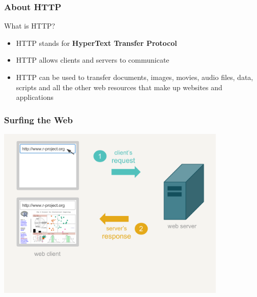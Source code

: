 \documentclass{beamer}\usepackage[]{graphicx}\usepackage[]{color}
\begin{document}

\begin{frame}
\frametitle{About HTTP}

\begin{block}{What is HTTP?}
\begin{itemize}
 \item HTTP stands for \textbf{HyperText Transfer Protocol}
 \item HTTP allows clients and servers to communicate \\
 \item HTTP can be used to transfer documents, images, movies, audio files, 
data, scripts and all the other web resources that make up websites and applications
\end{itemize}
\end{block}

\end{frame}


\begin{frame}
\frametitle{Surfing the Web}

\begin{center}
\includegraphics[width=11cm]{images/client_request_server_response.pdf}
\end{center}

\end{frame}

\end{document}
